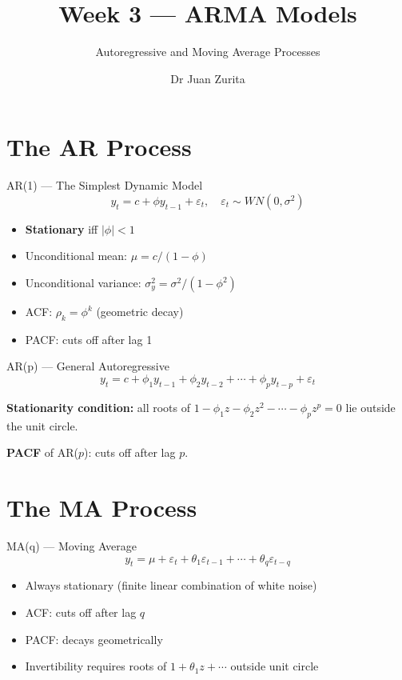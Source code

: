 \documentclass[aspectratio=169, 10pt]{beamer}
\title{Week 3 --- ARMA Models}
\subtitle{Autoregressive and Moving Average Processes}
\author{Dr Juan Zurita}
\institute{Economic \& Business Forecasting\\
The University of Edinburgh~$\cdot$~School of Economics}
\date{}
\begin{document}
\maketitle


\section{The AR Process}

\begin{frame}{AR(1) --- The Simplest Dynamic Model}
\[
y_t = c + \phi y_{t-1} + \varepsilon_t, \quad \varepsilon_t \sim WN(0, \sigma^2)
\]

\begin{itemize}
    \item \textbf{Stationary} iff $|\phi| < 1$
    \item Unconditional mean: $\mu = c / (1 - \phi)$
    \item Unconditional variance: $\sigma_y^2 = \sigma^2 / (1 - \phi^2)$
    \item ACF: $\rho_k = \phi^k$ (geometric decay)
    \item PACF: cuts off after lag 1
\end{itemize}
\end{frame}

\begin{frame}{AR(p) --- General Autoregressive}
\[
y_t = c + \phi_1 y_{t-1} + \phi_2 y_{t-2} + \cdots + \phi_p y_{t-p} + \varepsilon_t
\]

\textbf{Stationarity condition:} all roots of $1 - \phi_1 z - \phi_2 z^2 - \cdots - \phi_p z^p = 0$ lie \alert{outside} the unit circle.

\vspace{0.5em}
\textbf{PACF} of AR($p$): cuts off after lag $p$.
\end{frame}

\section{The MA Process}

\begin{frame}{MA(q) --- Moving Average}
\[
y_t = \mu + \varepsilon_t + \theta_1 \varepsilon_{t-1} + \cdots + \theta_q \varepsilon_{t-q}
\]

\begin{itemize}
    \item \alert{Always stationary} (finite linear combination of white noise)
    \item ACF: cuts off after lag $q$
    \item PACF: decays geometrically
    \item Invertibility requires roots of $1 + \theta_1 z + \cdots$ outside unit circle
\end{itemize}
\end{frame}
\end{document}
